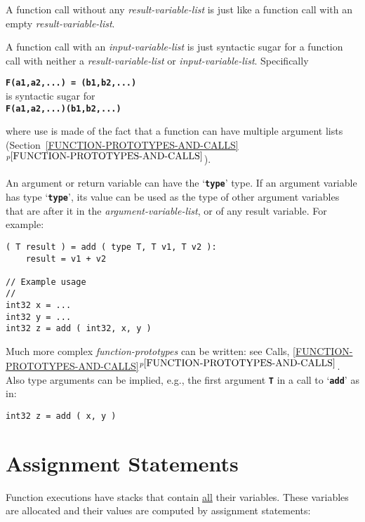 \documentclass[12pt]{article}
\newcommand{\TT}[1]{{\tt \bfseries #1}}
\newcommand{\itemref}[1]{\ref{#1}$^{p\pageref{#1}}$}
\newenvironment{indpar}[1][0.3in]%
	{\begin{list}{}%
		     {\setlength{\itemsep}{0in}%
		      \setlength{\topsep}{0in}%
		      \setlength{\parsep}{1ex}%
		      \setlength{\labelwidth}{#1}%
		      \setlength{\leftmargin}{#1}%
		      \addtolength{\leftmargin}{\labelsep}}%
	 \item}%
	{\end{list}}
\begin{document}
A function call without any {\em result-variable-list}
is just like a function call with an empty
{\em result-variable-list}.

A function call with an {\em input-variable-list} is just syntactic
sugar for a function call with neither a {\em result-variable-list}
or {\em input-variable-list}.  Specifically
\begin{center}
\TT{F(a1,a2,...)~=~(b1,b2,...)} \\
is syntactic sugar for \\
\TT{F(a1,a2,...)(b1,b2,...)} \\
\end{center}

where use is made of the fact that a function can have multiple
argument lists (Section~\itemref{FUNCTION-PROTOTYPES-AND-CALLS}).

An argument or return variable can have the `\TT{type}' type.
If an argument variable has type `\TT{type}', its value can be used as the
type of other argument variables that are
after it in the {\em argument-variable-list},
or of any result variable.  For example:

\begin{indpar}\begin{verbatim}
( T result ) = add ( type T, T v1, T v2 ):
    result = v1 + v2

// Example usage
//
int32 x = ...
int32 y = ...
int32 z = add ( int32, x, y )
\end{verbatim}\end{indpar}

Much more complex {\em function-prototypes} can be written:
see Calls, \itemref{FUNCTION-PROTOTYPES-AND-CALLS}.
Also type arguments can be implied, e.g., the first argument \TT{T}
in a call to `\TT{add}' as in:

\begin{indpar}\begin{verbatim}
int32 z = add ( x, y )
\end{verbatim}\end{indpar}

\section{Assignment Statements}
\label{ASSIGNMENT-STATEMENTS}

Function executions have stacks that contain \underline{all}
their variables.
These variables are allocated and their values are computed by
assignment statements:
\end{document}
